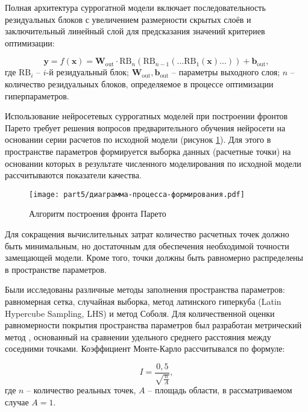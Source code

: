 Полная архитектура суррогатной модели включает последовательность резидуальных блоков
с увеличением размерности скрытых слоёв и заключительный линейный слой
для предсказания значений критериев оптимизации:

\begin{equation}
	\mathbf{y} = f(\mathbf{x}) = \mathbf{W}_\text{out} \cdot \text{RB}_n(\text{RB}_{n-1}(...\text{RB}_1(\mathbf{x})...)) + \mathbf{b}_\text{out},
\end{equation}
где $\text{RB}_i$ -- $i$-й резидуальный блок;
$\mathbf{W}_\text{out}, \mathbf{b}_\text{out}$ -- параметры выходного слоя;
$n$ -- количество резидуальных блоков, определяемое в процессе оптимизации гиперпараметров.

Использование нейросетевых суррогатных моделей при построении фронтов Парето
требует решения вопросов предварительного обучения нейросети на основании серии
расчетов по исходной модели (рисунок \ref{fig:process-diagram}). Для этого в пространстве
параметров формируется выборка данных (расчетные точки) на основании
которых в результате численного моделирования по исходной модели
рассчитываются показатели качества.

\begin{figure}[h]
	\centering
	\texttt{[image: part5/диаграмма-процесса-формирования.pdf]}
	\caption{Алгоритм построения фронта Парето}
	\label{fig:process-diagram}

\end{figure}

Для сокращения вычислительных затрат количество расчетных точек должно быть минимальным,
но достаточным для обеспечения необходимой точности замещающей модели.
Кроме того, точки должны быть равномерно распределены в пространстве параметров.

Были исследованы различные методы заполнения пространства параметров: равномерная сетка,
случайная выборка, метод латинского гиперкуба (Latin Hypercube Sampling, LHS) и метод Соболя.
Для количественной оценки равномерности покрытия пространства параметров был разработан метрический метод \cite{pub21},
основанный на сравнении удельного среднего расстояния между соседними точками.
Коэффициент Монте-Карло рассчитывался по формуле:

\begin{equation}
	I = \frac{0,5}{\sqrt{\frac{n}{A}}},
\end{equation}
где $n$ -- количество реальных точек, $A$ -- площадь области, в рассматриваемом случае $A = 1$.

